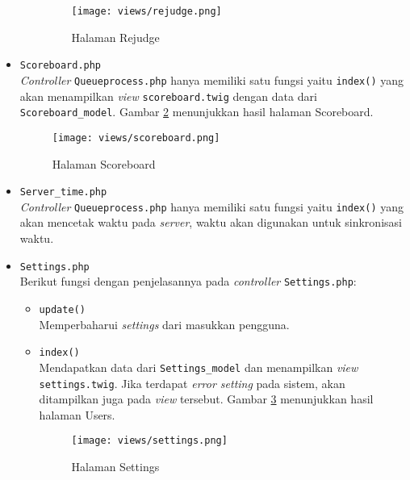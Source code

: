 \begin{itemize}
\begin{itemize}
		            \begin{figure}[H]
			            \centering
			            \texttt{[image: views/rejudge.png]}
			            \caption{Halaman Rejudge}
			            \label{fig:3:1:1:rejudge}
		            \end{figure}

	      \end{itemize}

	\item \verb|Scoreboard.php| \\
	      \textit{Controller} \verb|Queueprocess.php| hanya memiliki satu fungsi yaitu \verb|index()| yang akan menampilkan \textit{view} \verb|scoreboard.twig| dengan data dari \verb|Scoreboard_model|. Gambar \ref{fig:3:1:1:scoreboard} menunjukkan hasil halaman Scoreboard.

	      \begin{figure}[H]
		      \centering
		      \texttt{[image: views/scoreboard.png]}
		      \caption{Halaman Scoreboard}
		      \label{fig:3:1:1:scoreboard}
	      \end{figure}

	\item \verb|Server_time.php| \\
	      \textit{Controller} \verb|Queueprocess.php| hanya memiliki satu fungsi yaitu \verb|index()| yang akan mencetak waktu pada \textit{server}, waktu akan digunakan untuk sinkronisasi waktu.

	\item \verb|Settings.php| \\
	      Berikut fungsi dengan penjelasannya pada \textit{controller} \verb|Settings.php|:

	      \begin{itemize}
		      \item \verb|update()| \\
		            Memperbaharui \textit{settings} dari masukkan pengguna.
		      \item \verb|index()| \\
		            Mendapatkan data dari \verb|Settings_model| dan menampilkan \textit{view} \verb|settings.twig|. Jika terdapat \textit{error setting} pada sistem, akan ditampilkan juga pada \textit{view} tersebut. Gambar \ref{fig:3:1:1:settings} menunjukkan hasil halaman Users.

		            \begin{figure}[H]
			            \centering
			            \texttt{[image: views/settings.png]}
			            \caption{Halaman Settings}
			            \label{fig:3:1:1:settings}
		            \end{figure}


\end{itemize}
\end{itemize}
